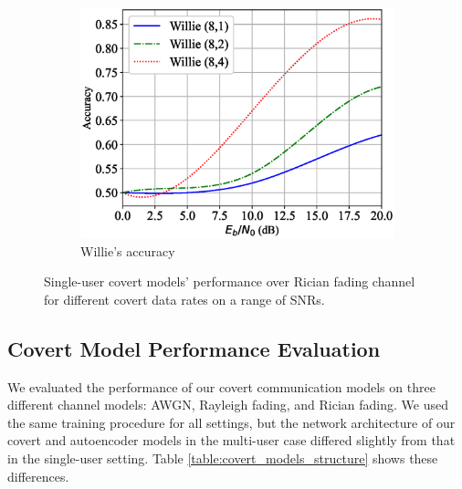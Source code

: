\begin{figure}[tp!]
\begin{subfigure}{0.28\textwidth}
		\includegraphics[width=\linewidth]{figs/willie_accuracy_rician}
		\caption{Willie's accuracy}
		\label{fig:rician_resutls_willie}
	\end{subfigure}
	\caption{Single-user covert models' performance over Rician fading channel for different covert data rates on a range of SNRs.}
	\label{fig:rician_resutls}
\end{figure}


\subsection{Covert Model Performance Evaluation}
We evaluated the performance of our covert communication models on three different channel models: AWGN, Rayleigh fading, and Rician fading. We used the same training procedure for all settings, but the network architecture of our covert and autoencoder models in the multi-user case differed slightly from that in the single-user setting. Table \ref{table:covert_models_structure} shows these differences.

